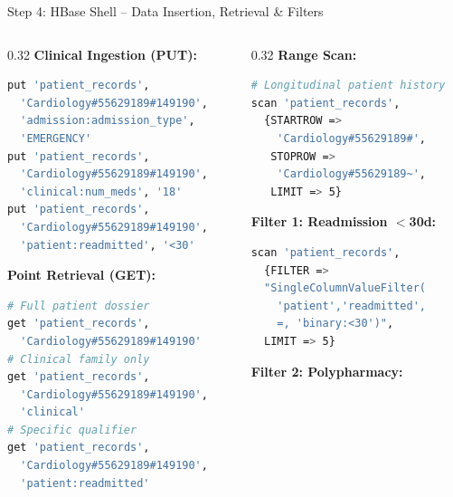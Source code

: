 \documentclass[aspectratio=169]{beamer}
\begin{document}
\begin{frame}[fragile,shrink=5]{Step 4: HBase Shell -- Data Insertion, Retrieval \& Filters}
    \begin{columns}[T]
        \begin{column}{0.32\textwidth}
            \textbf{\textcolor{NavyBlue}{Clinical Ingestion (PUT):}}
            \begin{lstlisting}[language=bash]
put 'patient_records', 
  'Cardiology#55629189#149190', 
  'admission:admission_type', 
  'EMERGENCY'
put 'patient_records', 
  'Cardiology#55629189#149190', 
  'clinical:num_meds', '18'
put 'patient_records', 
  'Cardiology#55629189#149190', 
  'patient:readmitted', '<30'
            \end{lstlisting}
            \vspace{0.05cm}
            \textbf{\textcolor{NavyBlue}{Point Retrieval (GET):}}
            \begin{lstlisting}[language=bash]
# Full patient dossier
get 'patient_records', 
  'Cardiology#55629189#149190'
# Clinical family only
get 'patient_records', 
  'Cardiology#55629189#149190',
  'clinical'
# Specific qualifier
get 'patient_records', 
  'Cardiology#55629189#149190',
  'patient:readmitted'
            \end{lstlisting}
        \end{column}
        \begin{column}{0.32\textwidth}
            \textbf{\textcolor{NavyBlue}{Range Scan:}}
            \begin{lstlisting}[language=bash]
# Longitudinal patient history
scan 'patient_records', 
  {STARTROW => 
    'Cardiology#55629189#', 
   STOPROW => 
    'Cardiology#55629189~', 
   LIMIT => 5}
            \end{lstlisting}
            \vspace{0.05cm}
            \textbf{\textcolor{AmritaMaroon}{Filter 1: Readmission $<$30d:}}
            \begin{lstlisting}[language=bash]
scan 'patient_records', 
  {FILTER => 
  "SingleColumnValueFilter(
    'patient','readmitted',
    =, 'binary:<30')", 
  LIMIT => 5}
            \end{lstlisting}
            \vspace{0.05cm}
            \textbf{\textcolor{AmritaMaroon}{Filter 2: Polypharmacy:}}

\end{column}
\end{columns}
\end{frame}
\end{document}
